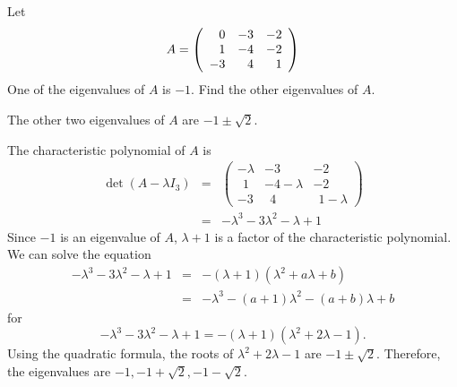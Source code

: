 \documentclass{ximera}
\author{Marty Golubitsky}
\begin{document}
\begin{exercise} \label{c10.2.25}
\rm Let
\[
A=\left(\begin{array}{rrr}  0 &  -3 &  -2 \\  1 &  -4 &  -2 \\  -3 &  4 &   1\end{array}\right)
\]
One of the eigenvalues of $A$ is $-1$.  Find the other eigenvalues of $A$.

\begin{solution}
\ans The other two eigenvalues of $A$ are $-1\pm \sqrt{2}$.

\soln The characteristic polynomial of $A$ is 
\begin{eqnarray*}
\det(A - \lambda I_3) & = & 
\begin{pmatrix}
-\lambda & -3 & -2 \\ \ \ 1 & -4 - \lambda & -2 \\ -3 & \ \ 4 & \ \ 1-\lambda
\end{pmatrix} \\ 
& = &  - \lambda^3 - 3\lambda^2 - \lambda +1
\end{eqnarray*}
Since $-1$ is an eigenvalue of $A$, $\lambda + 1$ is a factor of the characteristic polynomial.  We can solve the equation 
\begin{eqnarray*}
- \lambda^3 - 3\lambda^2 - \lambda +1 & = &  -(\lambda+1)(\lambda^2 + a\lambda + b) \\
& = & -\lambda^3 - (a+1)\lambda^2 - (a+b)\lambda + b 
\end{eqnarray*}
for
\[
- \lambda^3 - 3\lambda^2 - \lambda +1 = -(\lambda+1)(\lambda^2 +2 \lambda -1).
\]
Using the quadratic formula, the roots of $\lambda^2 +2 \lambda -1$ are $ -1 \pm \sqrt{2} $. Therefore, the eigenvalues are $-1, -1 + \sqrt{2}, -1 - \sqrt{2}$.
\end{solution}

  

\end{exercise}
\end{document}
